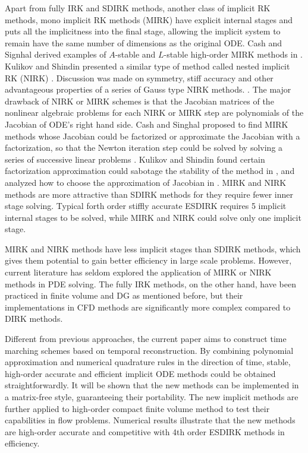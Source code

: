 \documentclass[preprint,12pt]{elsarticle}
\begin{document}
Apart from fully IRK and SDIRK methods,
another class of implicit RK methods,
mono implicit RK methods (MIRK)
\cite{cash1975classMIRKOrig}
have explicit internal stages and
puts all the implicitness into the final
stage, allowing the implicit system to
remain have the same number of dimensions
as the original ODE.
Cash and Signhal derived examples of
$A$-stable and $L$-stable high-order
MIRK methods in
\cite{cash1977clasMIRK1,cash1982monoMIRK2}.
Kulikov and Shindin presented a similar type
of method called nested implicit RK (NIRK)
\cite{kulikov2006familyNIRKOrig}.
Discussion was made on symmetry, stiff accuracy and
other advantageous properties of a series of Gauss type
NIRK methods.
\cite{kulikov2009adaptive}.
The major drawback of NIRK or MIRK schemes is that
the Jacobian matrices of the nonlinear algebraic problems
for each NIRK or MIRK step are
polynomials of the Jacobian of ODE's right hand side.
Cash and Singhal proposed to find MIRK methods whose
Jacobian could be factorized or approximate the Jacobian
with a factorization,
so that the Newton iteration
step could be solved by solving a series of successive linear
problems \cite{cash1982monoMIRK2}.
Kulikov and Shindin found certain factorization
approximation could sabotage the stability of
the method in
\cite{kulikov2009adaptive},
and analyzed how to choose the approximation of
Jacobian in
\cite{kulikov2007asymptotic}.
MIRK and NIRK methods are more attractive than SDIRK methods
for they require fewer inner stage solving.
Typical forth order
stiffly accurate ESDIRK requires 5 implicit internal stages to be
solved,
while MIRK and NIRK could
solve only one implicit stage.


MIRK and NIRK methods have less
implicit stages than SDIRK methods,
which gives them potential to gain better efficiency in
large scale problems.
However, current literature has seldom explored
the application of MIRK or NIRK methods in
PDE solving.
The fully IRK methods, on the other hand,
have been practiced in
finite volume \cite{jameson2017evaluation} and
DG \cite{pazner2017stage}
as mentioned before,
but their implementations
in CFD methods are significantly more
complex compared to DIRK methods.

Different from previous approaches,
the current paper aims to construct
time marching schemes based on temporal
reconstruction.
By combining polynomial approximation and
numerical quadrature rules in the direction of time,
stable, high-order accurate and efficient implicit ODE methods could be
obtained straightforwardly.
It will be shown that the new methods can be implemented
in a matrix-free style, guaranteeing their portability.
The new implicit methods are further applied to
high-order compact finite volume method to
test their capabilities in flow problems. Numerical results
illustrate that the new methods are high-order accurate
and competitive with 4th order ESDIRK methods in efficiency.
\end{document}
